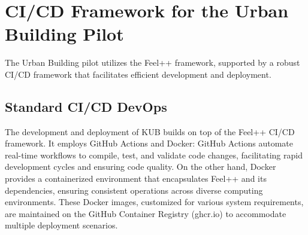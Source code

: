 \documentclass[runningheads]{llncs}
\begin{document}


\section{CI/CD Framework for the Urban Building Pilot}
\label{sec:cicd-framework}

The Urban Building pilot utilizes the Feel++ framework, supported by a robust CI/CD framework that facilitates efficient development and deployment. %

\subsection{Standard CI/CD DevOps}
The development and deployment of KUB builds on top of the Feel++ CI/CD framework. It employs GitHub Actions and Docker: GitHub Actions automate real-time workflows to compile, test, and validate code changes, facilitating rapid development cycles and ensuring code quality.
On the other hand, Docker provides a containerized environment that encapsulates Feel++ and its dependencies, ensuring consistent operations across diverse computing environments.
These Docker images, customized for various system requirements, are maintained on the GitHub Container Registry (ghcr.io) to accommodate multiple deployment scenarios.
\end{document}
